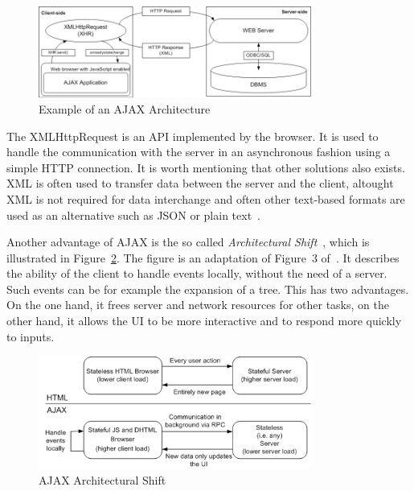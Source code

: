\begin{figure}[h]
	\begin{center}
		\includegraphics[width=0.8\textwidth]{./img/ajax01a.png}
		\caption{Example of an AJAX Architecture}
		\label{fig:ajax01}
	\end{center}
\end{figure}

The XMLHttpRequest is an API implemented by the browser. It is 
used to handle the communication with the server in an asynchronous fashion using a
simple HTTP connection. It is worth mentioning that other solutions also exists. 
XML is often used to transfer data between the server and the client, 
altought XML is not required for data interchange and often other text-based
formats are used as an alternative such as JSON or plain text~\cite{bajax1}.

Another advantage of AJAX is the so called \textit{Architectural Shift}~\cite{wgdd1}, 
which is illustrated in Figure~\ref{fig:ajax02}. The figure 
is an adaptation of Figure~3 of~\cite{wgdd1}. 
It describes the ability of the client to handle events
locally, without the need of a server. Such events can be for example the
expansion of a tree. This has two advantages. On the one hand, it frees server 
and network resources for other tasks, on the other hand, it allows
the UI to be more interactive and to respond more quickly to inputs.

\begin{figure}[h]
	\begin{center}
		\includegraphics[width=0.8\textwidth]{./img/ajax02a.png}
		\caption{AJAX Architectural Shift}
		\label{fig:ajax02}
	\end{center}
\end{figure}

